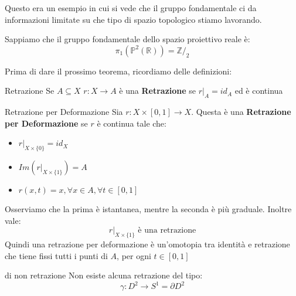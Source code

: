 \documentclass[11pt, a4paper, twoside]{article}
\begin{document}
Questo era un esempio in cui si vede che il gruppo fondamentale ci da informazioni limitate su che tipo di spazio topologico stiamo lavorando.

\begin{es}
	Sappiamo che il gruppo fondamentale dello spazio proiettivo reale è:
	\[ \pi_1(\mathbb P^2(\mathbb R)) = \mathbb Z/_2 \]

	\begin{center}
	\end{center}
\end{es}

Prima di dare il prossimo teorema, ricordiamo delle definizioni:

\begin{defn}{Retrazione}{}
	Se $A \subseteq X$ $r:X \to A$ è una \textbf{Retrazione} se $r|_A = id_A$ ed è continua
\end{defn}

\begin{defn}{Retrazione per Deformazione}{}
	Sia $r:X \times [0,1] \to X$. Questa è una \textbf{Retrazione per Deformazione} se $r$ è continua tale che:
	\begin{itemize}
		\item $r|_{X \times \{0\}} = id_X$
		\item $Im(r|_{X \times \{1\}}) = A$
		\item $r(x,t) = x, \forall x \in A, \forall t \in [0,1]$
	\end{itemize}
\end{defn}

Osserviamo che la prima è istantanea, mentre la seconda è più graduale. Inoltre vale:
\[ r|_{X \times \{1\}} \text{ è una retrazione}\]
Quindi una retrazione per deformazione è un'omotopia tra identità e retrazione che tiene fissi tutti i punti di $A$, per ogni $t \in [0,1]$

\begin{thm}{di non retrazione}{}\label{nonretraz}
	Non esiste alcuna retrazione del tipo:
	\[ \gamma: D^2 \to S^1 = \partial D^2 \]
\end{thm}
\end{document}
